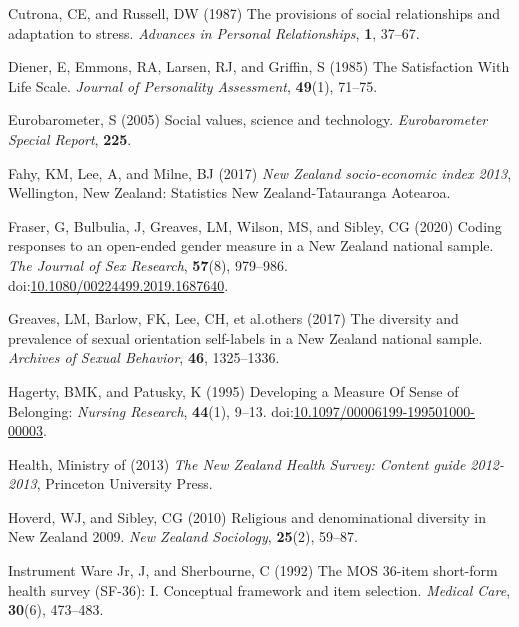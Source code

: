 \documentclass[
  single column]{article}
\newlength{\cslhangindent}
\newenvironment{CSLReferences}[2] %
 {\begin{list}{}{%
  \setlength{\itemindent}{0pt}
  \setlength{\leftmargin}{0pt}
  \setlength{\parsep}{0pt}
  \ifodd #1
   \setlength{\leftmargin}{\cslhangindent}
   \setlength{\itemindent}{-1\cslhangindent}
  \fi
  \setlength{\itemsep}{#2\baselineskip}}}
 {\end{list}}
\begin{document}
\begin{CSLReferences}{1}{0}
Cutrona, CE, and Russell, DW (1987) The provisions of social
relationships and adaptation to stress. \emph{Advances in Personal
Relationships}, \textbf{1}, 37--67.

Diener, E, Emmons, RA, Larsen, RJ, and Griffin, S (1985) The
Satisfaction With Life Scale. \emph{Journal of Personality Assessment},
\textbf{49}(1), 71--75.

Eurobarometer, S (2005) Social values, science and technology.
\emph{Eurobarometer Special Report}, \textbf{225}.

Fahy, KM, Lee, A, and Milne, BJ (2017) \emph{{N}ew {Z}ealand
socio-economic index 2013}, Wellington, New Zealand: Statistics New
Zealand-Tatauranga Aotearoa.

Fraser, G, Bulbulia, J, Greaves, LM, Wilson, MS, and Sibley, CG (2020)
Coding responses to an open-ended gender measure in a {N}ew {Z}ealand
national sample. \emph{The Journal of Sex Research}, \textbf{57}(8),
979--986.
doi:\href{https://doi.org/10.1080/00224499.2019.1687640}{10.1080/00224499.2019.1687640}.

Greaves, LM, Barlow, FK, Lee, CH, et al.others (2017) The diversity and
prevalence of sexual orientation self-labels in a {N}ew {Z}ealand
national sample. \emph{Archives of Sexual Behavior}, \textbf{46},
1325--1336.

Hagerty, BMK, and Patusky, K (1995) Developing a Measure Of Sense of
Belonging: \emph{Nursing Research}, \textbf{44}(1), 9--13.
doi:\href{https://doi.org/10.1097/00006199-199501000-00003}{10.1097/00006199-199501000-00003}.

Health, Ministry of (2013) \emph{The {N}ew {Z}ealand {H}ealth {S}urvey:
Content guide 2012-2013}, Princeton University Press.

Hoverd, WJ, and Sibley, CG (2010) Religious and denominational diversity
in {N}ew {Z}ealand 2009. \emph{New Zealand Sociology}, \textbf{25}(2),
59--87.

Instrument Ware Jr, J, and Sherbourne, C (1992) The MOS 36-item
short-form health survey (SF-36): I. Conceptual framework and item
selection. \emph{Medical Care}, \textbf{30}(6), 473--483.


\end{CSLReferences}
\end{document}
